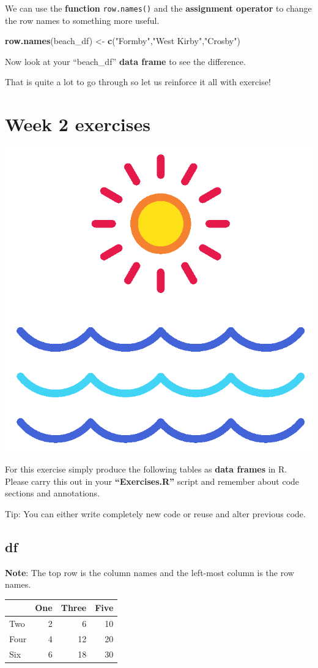 \documentclass[]{book}
\newenvironment{Shaded}{\begin{snugshade}}{\end{snugshade}}
\newcommand{\KeywordTok}[1]{\textcolor[rgb]{0.13,0.29,0.53}{\textbf{#1}}}
\newcommand{\StringTok}[1]{\textcolor[rgb]{0.31,0.60,0.02}{#1}}
\newcommand{\NormalTok}[1]{#1}
\begin{document}
We can use the \textbf{function} \texttt{row.names()} and the
\textbf{assignment operator} to change the row names to something more
useful.

\begin{Shaded}
\begin{Highlighting}[]
\KeywordTok{row.names}\NormalTok{(beach_df) <-}\StringTok{ }\KeywordTok{c}\NormalTok{(}\StringTok{"Formby"}\NormalTok{,}\StringTok{"West Kirby"}\NormalTok{,}\StringTok{"Crosby"}\NormalTok{)}
\end{Highlighting}
\end{Shaded}

Now look at your ``beach\_df'' \textbf{data frame} to see the
difference.

That is quite a lot to go through so let us reinforce it all with
exercise!

\chapter{Week 2 exercises}\label{week-2-exercises}

\begin{center}\includegraphics[width=0.2\linewidth]{figures/beach} \end{center}

For this exercise simply produce the following tables as \textbf{data
frames} in R. Please carry this out in your \textbf{``Exercises.R''}
script and remember about code sections and annotations.

Tip: You can either write completely new code or reuse and alter
previous code.

\section{df}\label{df}

\textbf{Note}: The top row is the column names and the left-most column
is the row names.

\begin{tabular}{l|r|r|r}
\hline
  & One & Three & Five\\
\hline
Two & 2 & 6 & 10\\
\hline
Four & 4 & 12 & 20\\
\hline
Six & 6 & 18 & 30\\
\hline
\end{tabular}
\end{document}
